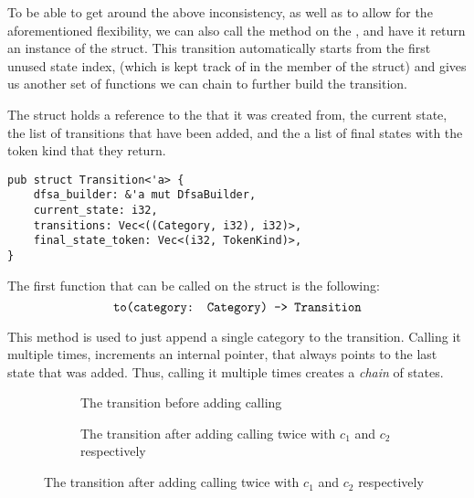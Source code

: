 To be able to get around the above inconsistency, as well as to allow for the
aforementioned flexibility, we can also call the  method on
the , and have it return an instance of the 
struct. This transition automatically starts from the first unused state index,
(which is kept track of in the  member of the
 struct) and gives us another set of functions we can chain to
further build the transition.

The  struct holds a reference to the  that it
was created from, the current state, the list of transitions that have been
added, and the a list of final states with the token kind that they return.

\begin{mainbox}{}
    \lstset{xleftmargin=1cm}
    \begin{lstlisting}
pub struct Transition<'a> {
    dfsa_builder: &'a mut DfsaBuilder,
    current_state: i32,
    transitions: Vec<((Category, i32), i32)>,
    final_state_token: Vec<(i32, TokenKind)>,
}
    \end{lstlisting}
\end{mainbox}


The first function that can be called on the  struct is the following:
$$\texttt{to(category: Category) -> Transition}$$

This method is used to just append a single category to the transition. Calling
it multiple times, increments an internal pointer, that always points to the
last state that was added. Thus, calling it multiple times creates a
\textit{chain} of states.


\begin{figure}[H]
    \begin{subfigure}[t]{0.5\textwidth}
        \centering
        \caption{The transition before adding calling }
    \end{subfigure}
    \begin{subfigure}[t]{0.5\textwidth}
        \centering
        \caption{The transition after adding calling  twice with $c_1$ and $c_2$ respectively}
    \end{subfigure}
\end{figure}


